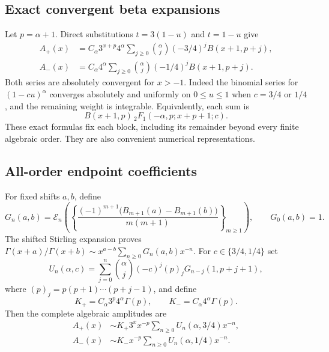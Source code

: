 \documentclass[11pt,openany]{book}
\numberwithin{equation}{chapter}
\theoremstyle{plain}
\theoremstyle{definition}
\theoremstyle{remark}
\newcommand{\ExpC}{\mathcal E}\newcommand{\LogC}{\mathcal L}
\begin{document}
\subsection{Exact convergent beta expansions}
Let $p=\alpha+1$. Direct substitutions $t=3(1-u)$ and $t=1-u$ give
\begin{align}
 A_+(x)&=C_\alpha3^{x+p}4^\alpha
 \sum_{j\ge0}\binom\alpha j(-3/4)^j B(x+1,p+j),\nonumber\\
 A_-(x)&=C_\alpha4^\alpha
 \sum_{j\ge0}\binom\alpha j(-1/4)^j B(x+1,p+j).
 \label{t1:eq:betablocks}
\end{align}
Both series are absolutely convergent for $x>-1$. Indeed the binomial series for $(1-cu)^\alpha$ converges absolutely and uniformly on $0\le u\le1$ when $c=3/4$ or $1/4$, and the remaining weight is integrable. Equivalently, each sum is
\begin{equation}
 B(x+1,p)\,{}_2F_1(-\alpha,p;x+p+1;c).
 \label{t1:eq:hyperblock}
\end{equation}
These exact formulas fix each block, including its remainder beyond every finite algebraic order. They are also convenient numerical representations.

\subsection{All-order endpoint coefficients}
For fixed shifts $a,b$, define
\begin{equation}
 G_n(a,b)=\ExpC_n\!\left(
 \left\{\frac{(-1)^{m+1}\bigl(B_{m+1}(a)-B_{m+1}(b)\bigr)}{m(m+1)}\right\}_{m\ge1}
 \right),\qquad G_0(a,b)=1.
 \label{t1:eq:gammaratiocoeff}
\end{equation}
The shifted Stirling expansion proves
$\Gamma(x+a)/\Gamma(x+b)\sim x^{a-b}\sum_{n\ge0}G_n(a,b)x^{-n}$.
For $c\in\{3/4,1/4\}$ set
\begin{equation}
 U_n(\alpha,c)=\sum_{j=0}^n\binom\alpha j(-c)^j(p)_j
 G_{n-j}(1,p+j+1),
 \label{t1:eq:endpointcoeff}
\end{equation}
where $(p)_j=p(p+1)\cdots(p+j-1)$, and define
\begin{equation}
 K_+=C_\alpha3^p4^\alpha\Gamma(p),\qquad
 K_-=C_\alpha4^\alpha\Gamma(p).
 \label{t1:eq:endpointconstants}
\end{equation}
Then the complete algebraic amplitudes are
\begin{align}
 A_+(x)&\sim K_+3^x x^{-p}\sum_{n\ge0}U_n(\alpha,3/4)x^{-n},\nonumber\\
 A_-(x)&\sim K_-x^{-p}\sum_{n\ge0}U_n(\alpha,1/4)x^{-n}.
 \label{t1:eq:endpointasympt}
\end{align}
\end{document}
